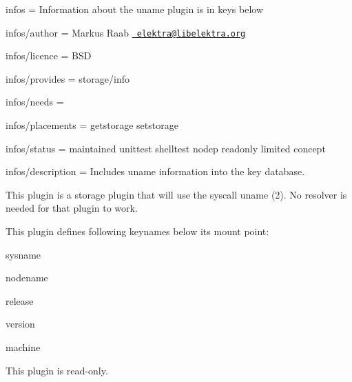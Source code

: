 
\begin{DoxyItemize}
\item infos = Information about the uname plugin is in keys below
\item infos/author = Markus Raab \href{mailto:elektra@libelektra.org}{\texttt{ elektra@libelektra.\+org}}
\item infos/licence = B\+SD
\item infos/provides = storage/info
\item infos/needs =
\item infos/placements = getstorage setstorage
\item infos/status = maintained unittest shelltest nodep readonly limited concept
\item infos/description = Includes uname information into the key database.
\end{DoxyItemize}

This plugin is a storage plugin that will use the syscall {\ttfamily uname (2)}. No resolver is needed for that plugin to work.

This plugin defines following keynames below its mount point\+:


\begin{DoxyItemize}
\item sysname
\item nodename
\item release
\item version
\item machine
\end{DoxyItemize}

This plugin is read-\/only.


\begin{DoxyCode}{0}
\DoxyCodeLine{}
\DoxyCodeLine{}
\DoxyCodeLine{}
\DoxyCodeLine{}
\end{DoxyCode}
 